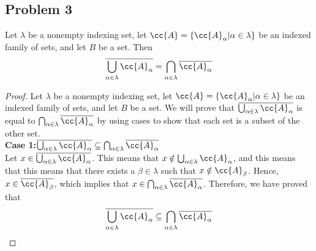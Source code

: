 \newpage
\subsection{Problem 3}
    \begin{tcolorbox}
        Let $\lambda$ be a nonempty indexing set, let $\cc{A} = \{ \cc{A}_\alpha | \alpha \in \lambda \}$ be an indexed family of sets, and let $B$ be a set. Then 
            \begin{equation*}
                \overline{\bigcup_{\alpha \in \lambda} \cc{A}_\alpha } = \bigcap_{\alpha \in \lambda} \overline{\cc{A}_\alpha}
            \end{equation*}
    \end{tcolorbox}

    \begin{proof}
        Let $\lambda$ be a nonempty indexing set, let $\cc{A} = \{ \cc{A}_\alpha | \alpha \in \lambda \}$ be an indexed family of sets, and let $B$ be a set. We will prove that $ \overline{\bigcup_{\alpha \in \lambda} \cc{A}_\alpha }$ is equal to $\bigcap_{\alpha \in \lambda} \overline{\cc{A}_\alpha}$ by using cases to show that each set is a subset of the other set. \\ 
        
        \textbf{Case 1:$\overline{\bigcup_{\alpha \in \lambda} \cc{A}_\alpha } \subseteq \bigcap_{\alpha \in \lambda} \overline{\cc{A}_\alpha}$} \\         
            Let $x \in \overline{\bigcup_{\alpha \in \lambda} \\ \cc{A}_\alpha } $. This means that $x \notin \bigcup_{\alpha \in \lambda} \cc{A}_\alpha$, and this means that this means that there exists a $\beta \in \lambda$ such that $x \notin \cc{A}_\beta$. Hence, $x \in \overline{\cc{A}_\beta}$, which implies that $x \in \bigcap_{\alpha \in \lambda} \overline{\cc{A}_\alpha}$. Therefore, we have proved that 
                \begin{equation*}
                    \overline{\bigcup_{\alpha \in \lambda} \cc{A}_\alpha } \subseteq \bigcap_{\alpha \in \lambda} \overline{\cc{A}_\alpha}
                \end{equation*}
        

\end{proof}
